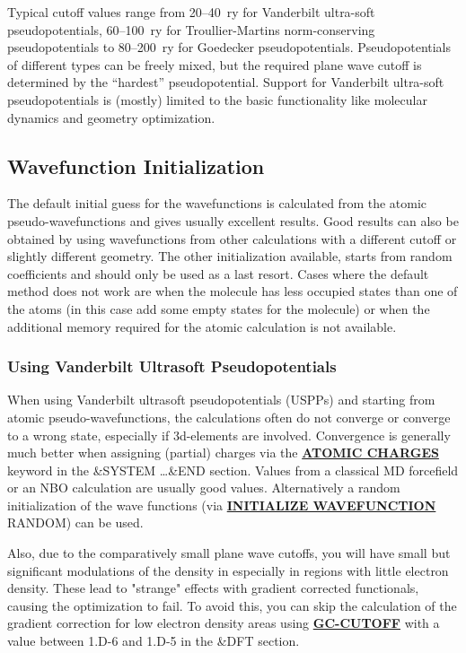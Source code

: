 \documentclass[twoside,10pt,titlepage,a4paper]{article}
\newcommand{\referto}[2]{\hyperlink{#1}{#2}}
\newcommand{\referto}[2]{\htmlref{#2}{#1}}
\newcommand{\refkeyword}[1]{%
\referto{#1}{\textbf{#1}}%
\index{#1}%
}%
\begin{document}
Typical cutoff values range from 20--40~ry for Vanderbilt ultra-soft
pseudopotentials, 60--100~ry for Troullier-Martins norm-conserving
pseudopotentials to 80--200~ry for Goedecker
pseudopotentials. Pseudopotentials of different types can be freely
mixed, but the required plane wave cutoff is determined by the
``hardest'' pseudopotential. Support for Vanderbilt ultra-soft
pseudopotentials is (mostly) limited to the basic functionality
like molecular dynamics and geometry optimization.\\

\subsection{Wavefunction Initialization}

  The default initial guess for the wavefunctions is calculated from the atomic
pseudo-wavefunctions and gives usually excellent results. Good results can also
be obtained by using wavefunctions from other calculations with a different
cutoff or slightly different geometry. The other initialization available,
starts from random coefficients and should only be used as a last resort. Cases
where the default method does not work are when the molecule has less occupied
states than one of the atoms (in this case add some empty states for the
molecule) or when the additional memory required for the atomic calculation is
not available.

\subsubsection{Using Vanderbilt Ultrasoft Pseudopotentials}
When using Vanderbilt ultrasoft pseudopotentials (USPPs) \cite{Vanderbilt} and 
starting from atomic pseudo-wave\-func\-tions, the calculations often do not
converge or converge to a wrong state, especially if 3d-elements are
involved. Convergence is generally much better when assigning (partial)
charges via the \refkeyword{ATOMIC CHARGES} keyword in the \&SYSTEM
\ldots \&END section. Values from a classical MD forcefield or an NBO
calculation are usually good values. Alternatively a random initialization
of the wave functions (via \refkeyword{INITIALIZE WAVEFUNCTION} RANDOM)
can be used.

Also, due to the comparatively small plane wave cutoffs, you will have small
but significant modulations of the density in especially in regions with
little electron density. These lead to "strange" effects with
gradient corrected functionals, causing the optimization to fail.
To avoid this, you can skip the calculation of the gradient correction
for low electron density areas using \refkeyword{GC-CUTOFF} with a value
between 1.D-6 and 1.D-5 in the \&DFT section.
\end{document}
